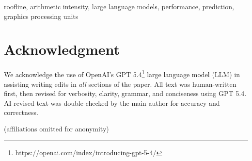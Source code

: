 \documentclass[conference]{IEEEtran}
\begin{document}
\begin{IEEEkeywords}
roofline, arithmetic intensity, large language models, performance, prediction, graphics processing units
\end{IEEEkeywords}








\section*{Acknowledgment}
We acknowledge the use of OpenAI's GPT 5.4\footnote{https://openai.com/index/introducing-gpt-5-4/} large language model (LLM) in assisting writing edits in \textit{all} sections of the paper.
All text was human-written first, then revised for verbosity, clarity, grammar, and conciseness using GPT 5.4. 
AI-revised text was double-checked by the main author for accuracy and correctness.

(affiliations omitted for anonymity)

% 

\newpage
\printbibliography


% 
\end{document}
